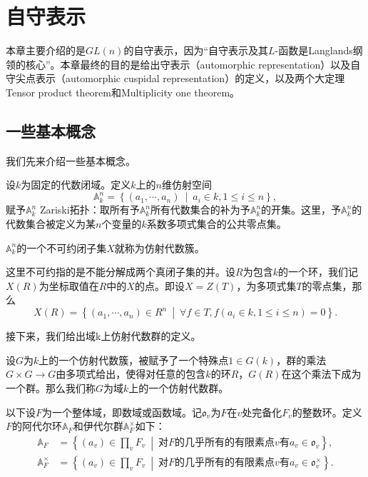 \chapter{自守表示}
\label{chap:aut_rep}

本章主要介绍的是$GL(n)$的自守表示，因为``自守表示及其$L$-函数是Langlands纲领的核心''\cite{gelbart1984elementary}。本章最终的目的是给出守表示（automorphic representation）以及自守尖点表示（automorphic cuspidal representation）的定义，以及两个大定理Tensor product theorem和Multiplicity one theorem。

\section{一些基本概念}
\label{sec:aut_rep_intro}

我们先来介绍一些基本概念。

设$k$为固定的代数闭域。定义$k$上的$n$维仿射空间\cite{alg_geo}
$$
\mathbb{A}_k^n = \left\{ (a_1,\cdots,a_n) \  \middle| \  a_i\in k, 1 \leqslant i \leqslant n \right\},
$$
赋予$\mathbb{A}_k^n$ Zariski拓扑：取所有予$\mathbb{A}_k^n$所有代数集合的补为予$\mathbb{A}_k^n$的开集。这里，予$\mathbb{A}_k^n$的代数集合被定义为某$n$个变量的$k$系数多项式集合的公共零点集。

\begin{definition}
$\mathbb{A}_k^n$的一个不可约闭子集$X$就称为仿射代数簇。
\end{definition}
这里不可约指的是不能分解成两个真闭子集的并。设$R$为包含$k$的一个环，我们记$X(R)$为坐标取值在$R$中的$X$的点。即设$X = Z(T)$，为多项式集$T$的零点集，那么
$$
X(R) = \left\{ (a_1,\cdots,a_n) \in R^n \  \middle| \ \forall f\in T, f(a_i\in k, 1 \leqslant i \leqslant n) = 0 \right\}.
$$

接下来，我们给出域k上仿射代数群的定义。
\begin{definition}
设$G$为$k$上的一个仿射代数簇，被赋予了一个特殊点$1 \in G(k)$，群的乘法$G \times G \rightarrow G$由多项式给出，使得对任意的包含$k$的环$R$，$G(R)$在这个乘法下成为一个群。那么我们称$G$为域$k$上的一个仿射代数群。
\end{definition}

以下设$F$为一个整体域，即数域或函数域。记$\mathfrak{o}_v$为$F$在$v$处完备化$F_{v}$的整数环。定义$F$的阿代尔环$\mathbb{A}_F$和伊代尔群$\mathbb{A}_F^\times$如下：
\begin{align*}
\mathbb{A}_F & = \left\{ (a_v) \in \prod\limits_v F_v \ \middle|\ \text{对$F$的几乎所有的有限素点$v$有} a_v\in \mathfrak{o}_v \right\}, \\[1em]
\mathbb{A}_F^\times & = \left\{ (a_v) \in \prod\limits_v F_v \ \middle|\ \text{对$F$的几乎所有的有限素点$v$有} a_v\in \mathfrak{o}_v^\times \right\}.
\end{align*}

